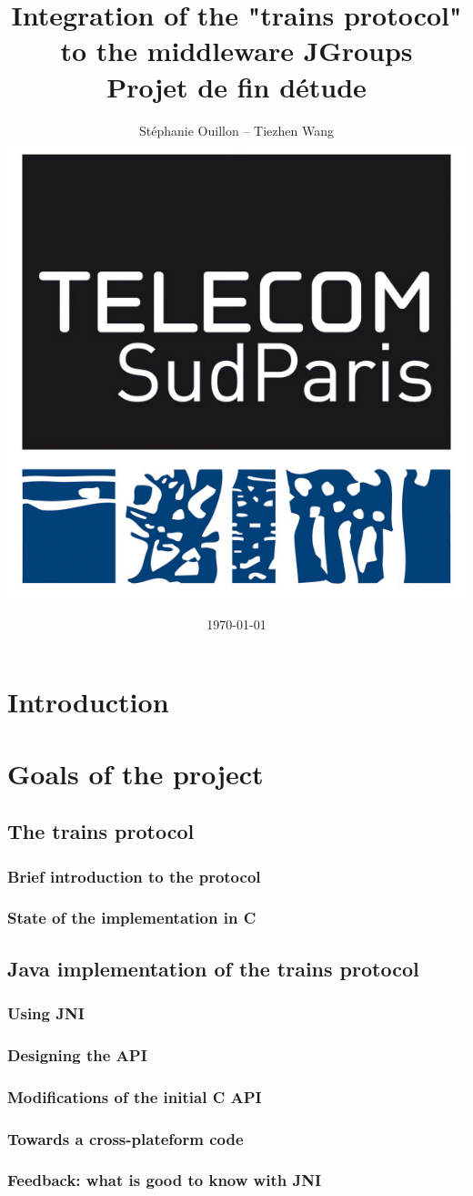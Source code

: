 \documentclass[a4paper,10pt]{report}
\title{Integration of the "trains protocol" to the middleware JGroups \\ Projet de fin d\'etude}
\author{St\'ephanie Ouillon -- Tiezhen Wang \\ \includegraphics[scale=0.3]{img/int.jpg}}
\date{\today}
\begin{document}
\maketitle

\tableofcontents

\chapter*{Introduction}

\chapter{Goals of the project}

\section{The trains protocol}
\subsection{Brief introduction to the protocol}
\subsection{State of the implementation in C}

\section{Java implementation of the trains protocol}
\subsection{Using JNI}
\subsection{Designing the API}
\subsection{Modifications of the initial C API}
\subsection{Towards a cross-plateform code}
\subsection{Feedback: what is good to know with JNI}
\end{document}
